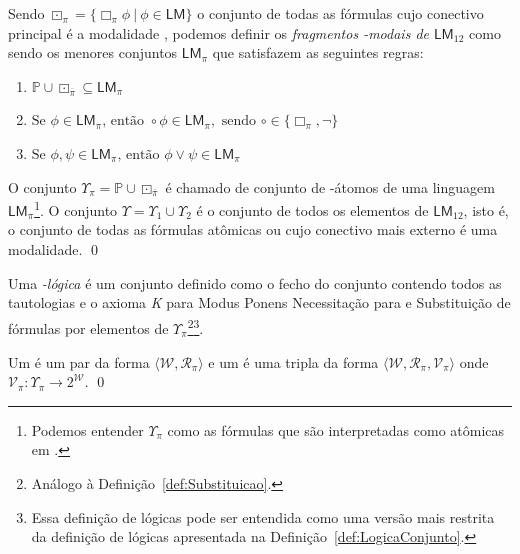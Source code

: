             \begin{definicao}
                \label{def:FragmentosMonomodais}
                Sendo \({\boxdot_{\pi} = \{\Box_{\pi} \phi \ | \ \phi \in \mathsf{LM} \}}\) o conjunto de todas as fórmulas cujo conectivo principal é a modalidade \BOXi{\pi},
                podemos definir os \textit{fragmentos \PI-modais de \(\mathsf{LM}_{12}\)} como sendo os menores conjuntos \(\mathsf{LM}_\pi\) que satisfazem as seguintes regras:
                \begin{enumerate}[label=]%
                    \item \(\mathbb{P} \cup \boxdot_{\overline{\pi}} \subseteq \mathsf{LM}_\pi\)
                    \item \(\text{Se } \phi \in \mathsf{LM}_\pi \text{, então } \circ \phi \in \mathsf{LM}_\pi, \text{ sendo } \circ \in \{\Box_\pi, \neg\}\)
                    \item \(\text{Se } \phi, \psi \in \mathsf{LM}_\pi \text{, então } \phi \lor \psi \in \mathsf{LM}_\pi\)
                \end{enumerate}
                O conjunto \(\Upsilon_\pi = \mathbb{P} \cup \boxdot_{\overline{\pi}}\) é chamado de conjunto de \PI-átomos de uma linguagem
                \(\mathsf{LM}_\pi\)\footnote{Podemos entender \(\Upsilon_\pi\) como as fórmulas que são interpretadas como atômicas em .}.
                O conjunto \({\Upsilon = \Upsilon_1 \cup \Upsilon_2}\) é o conjunto de todos os elementos de \(\mathsf{LM}_{12}\), isto é, o conjunto de todas as fórmulas atômicas
                ou cujo conectivo mais externo é uma modalidade. \qed
            \end{definicao}

            \begin{definicao}
                Uma \textit{\PI-lógica} é um conjunto  definido como o fecho do conjunto contendo todos as tautologias e o axioma \textit{K}\textsubscript{\PI}
                para Modus Ponens Necessitação para \BOXi{\pi} e Substituição de fórmulas por elementos de \(\Upsilon_\pi\)\footnote{Análogo à
                Definição~\ref{def:Substituicao}.}\footnote{Essa definição de lógicas pode ser entendida como uma versão mais restrita da definição de lógicas apresentada na
                Definição~\ref{def:LogicaConjunto}.}.

                Um \textit{\PIframe} é um par da forma \(\langle \mathcal{W}, \mathcal{R}_\pi \rangle\) e um \textit{\PImodelo} é uma tripla da forma
                \(\langle \mathcal{W}, \mathcal{R}_\pi, \mathcal{V}_\pi \rangle\) onde \(\mathcal{V}_\pi: \Upsilon_\pi \to 2^{\mathcal{W}}\). \qed
            \end{definicao}

